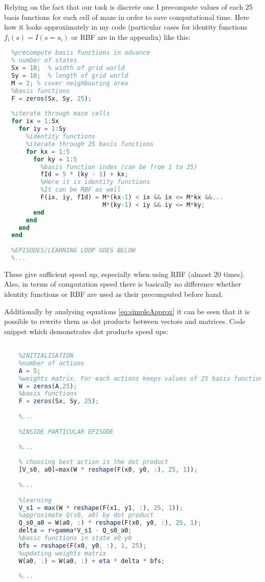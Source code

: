 \documentclass[a4paper,11pt]{article}
\theoremstyle{mytheor}
\begin{document}
Relying on the fact that our task is discrete one I precompute values of each 25 basis functions for each cell of maze in order to save computational time. Here how it looks approximately in my code (particular cases for identity functions $f_{i}(s)=I(s=s_i)$ or RBF are in the appendix) like this:
\begin{lstlisting}[language=Octave]
  %...
  %precompute basis functions in advance
  % number of states
  Sx = 10;  % width of grid world
  Sy = 10;  % length of grid world
  M = 2; % cover neighbouring area
  %basis functions
  F = zeros(Sx, Sy, 25);
  
  %iterate through maze cells
  for ix = 1:Sx
    for iy = 1:Sy
      %identity functions
      %iterate through 25 basis functions
      for kx = 1:5
        for ky = 1:5
          %basis function index (can be from 1 to 25)
          fId = 5 * (ky - 1) + kx;
          %Here it is identity functions 
          %It can be RBF as well
          F(ix, iy, fId) = M*(kx-1) < ix && ix <= M*kx &&...
                           M*(ky-1) < iy && iy <= M*ky;
        end
      end
    end
  end
  
  %EPISODES/LEARNING LOOP GOES BELOW
  %...
\end{lstlisting}
These give sufficient speed up, especially when using RBF (almost 20 times). Also, in terms of computation speed there is basically no difference whether identity functions or RBF are used as their precomputed before hand.

Additionally by analysing equations \ref{eq:simpleApprox} it can be seen that it is possible to rewrite them as dot products between vectors and matrices. Code snippet which demonstrates dot products speed ups:
\begin{lstlisting}[language=Octave]
    %...

    %INITIALISATION 
    %number of actions
    A = 5;
    %weights matrix. For each actions keeps values of 25 basis functions
    W = zeros(A,25);
    %basis functions
    F = zeros(Sx, Sy, 25);
  
    %...
    
    %INSIDE PARTICULAR EPISODE
    
    %...
    
    % choosing best action is the dot product
    [V_s0, a0]=max(W * reshape(F(x0, y0, :), 25, 1));  
    
    %...
    
    %learning
    V_s1 = max(W * reshape(F(x1, y1, :), 25, 1)); 
    %approximate Q(s0, a0) by dot product
    Q_s0_a0 = W(a0, :) * reshape(F(x0, y0, :), 25, 1);
    delta = r+gamma*V_s1 - Q_s0_a0;
    %basic functions in state x0 y0
    bfs = reshape(F(x0, y0, :), 1, 25);
    %updating weights matrix
    W(a0, :) = W(a0, :) + eta * delta * bfs;
    
    %...
\end{lstlisting}
\end{document}
